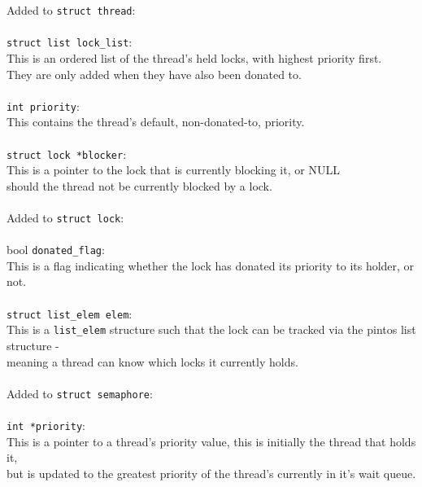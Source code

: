 \documentclass[a4wide, 11pt]{article}
\newcommand{\tab}{\hspace*{2em}}
\newcommand{\tx}{\texttt}
\begin{document}
Added to \tx{struct thread}: \\\\
\tab\tab \tx{struct list lock\_list}:\\
\tab\tab This is an ordered list of the thread's held locks, with highest priority first. \\
\tab\tab They are only added when they have also been donated to.
\\\\
 \tab\tab   \tx{int priority}:\\
 \tab\tab This contains the thread's default, non-donated-to, priority.
\\\\
\tab\tab \tx{struct lock *blocker}:\\
\tab\tab This is a pointer to the lock that is currently blocking it, or NULL \\
\tab\tab should the thread not be currently blocked by a lock.
    \\\\    
Added to \tx{struct lock}:
\\\\
\tab\tab bool \tx{donated\_flag}:\\
\tab\tab This is a flag indicating whether the lock has donated its priority to its holder, or not.
\\\\
\tab\tab \tx{struct list\_elem elem}:\\
\tab\tab This is a \tx{list\_elem} structure such that the lock can be tracked via the pintos list structure -\\
\tab\tab meaning a thread can know which locks it currently holds.
\\\\
Added to \tx{struct semaphore}:
  \\\\  
\tab\tab \tx{int *priority}:\\
\tab\tab This is a pointer to a thread's priority value, this is initially the thread that holds it,\\
\tab\tab but is updated to the greatest priority of the thread's currently in it's wait queue.
\newpage
\end{document}
